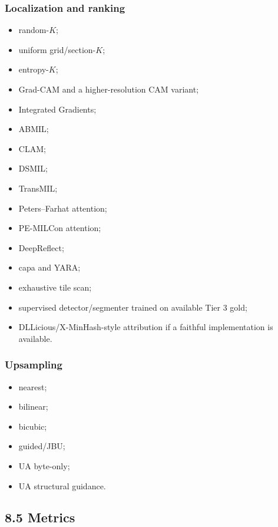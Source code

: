 \documentclass[
  10pt,
]{article}
\providecommand{\tightlist}{%
  \setlength{\itemsep}{0pt}\setlength{\parskip}{0pt}}
\begin{document}
\subsubsection{Localization and ranking}\label{localization-and-ranking}

\begin{itemize}
\tightlist
\item
  random-\(K\);
\item
  uniform grid/section-\(K\);
\item
  entropy-\(K\);
\item
  Grad-CAM and a higher-resolution CAM variant;
\item
  Integrated Gradients;
\item
  ABMIL;
\item
  CLAM;
\item
  DSMIL;
\item
  TransMIL;
\item
  Peters--Farhat attention;
\item
  PE-MILCon attention;
\item
  DeepReflect;
\item
  capa and YARA;
\item
  exhaustive tile scan;
\item
  supervised detector/segmenter trained on available Tier 3 gold;
\item
  DLLicious/X-MinHash-style attribution if a faithful implementation is
  available.
\end{itemize}

\subsubsection{Upsampling}\label{upsampling}

\begin{itemize}
\tightlist
\item
  nearest;
\item
  bilinear;
\item
  bicubic;
\item
  guided/JBU;
\item
  UA byte-only;
\item
  UA structural guidance.
\end{itemize}

\subsection{8.5 Metrics}\label{metrics}
\end{document}
